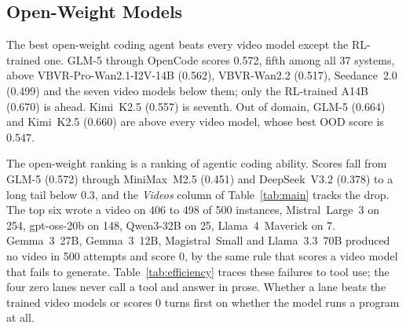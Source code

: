 \subsection{Open-Weight Models}
\label{sec:res-open}

The best open-weight coding agent beats every video model except the RL-trained one. GLM-5 through OpenCode scores 0.572, fifth among all 37 systems, above VBVR-Pro-Wan2.1-I2V-14B (0.562), VBVR-Wan2.2 (0.517), Seedance~2.0 (0.499) and the seven video models below them; only the RL-trained A14B (0.670) is ahead. Kimi~K2.5 (0.557) is seventh. Out of domain, GLM-5 (0.664) and Kimi~K2.5 (0.660) are above every video model, whose best OOD score is 0.547.

The open-weight ranking is a ranking of agentic coding ability. Scores fall from GLM-5 (0.572) through MiniMax~M2.5 (0.451) and DeepSeek~V3.2 (0.378) to a long tail below 0.3, and the \emph{Videos} column of Table~\ref{tab:main} tracks the drop. The top six wrote a video on 406 to 498 of 500 instances, Mistral~Large~3 on 254, gpt-oss-20b on 148, Qwen3-32B on 25, Llama~4~Maverick on 7. Gemma~3~27B, Gemma~3~12B, Magistral~Small and Llama~3.3~70B produced no video in 500 attempts and score 0, by the same rule that scores a video model that fails to generate. Table~\ref{tab:efficiency} traces these failures to tool use; the four zero lanes never call a tool and answer in prose. Whether a lane beats the trained video models or scores 0 turns first on whether the model runs a program at all.
